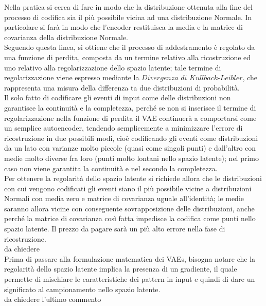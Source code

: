 Nella pratica si cerca di fare in modo che la distribuzione ottenuta alla fine del processo di codifica sia il più possibile vicina ad una distribuzione Normale. In particolare si farà in modo che l'encoder restituisca la media e la matrice di covarianza della distribuzione Normale. \\ 
Seguendo questa linea, si ottiene che il processo di addestramento è regolato da una funzione di perdita, composta da un termine relativo alla ricostruzione ed uno relativo alla regolarizzazione dello spazio latente; tale termine di regolarizzazione viene espresso mediante la $\textit{Divergenza di Kullback-Leibler}$, che rappresenta una misura della differenza ta due distribuzioni di probabilità. \\
Il solo fatto di codificare gli eventi di input come delle distribuzioni non garantisce la continuità e la completezza, perché se non si inserisce il termine di regolarizzazione nella funzione di perdita il VAE continuerà a comportarsi come un semplice autoencoder, tendendo semplicemente a minimizzare l'errore di ricostruzione in due possibili modi, cioè codificando gli eventi come distribuzioni da un lato con varianze molto piccole (quasi come singoli punti) e dall'altro con medie molto diverse fra loro (punti molto lontani nello spazio latente); nel primo caso non viene garantita la continuità e nel secondo la completezza. \\ 
Per ottenere la regolarità dello spazio latente si richiede allora che le distribuzioni con cui vengono codificati gli eventi siano il più possibile vicine a distribuzioni Normali con media zero e matrice di covarianza uguale all'identità; le medie saranno allora vicine con conseguente sovrapposizione delle distribuzioni, anche perché la matrice di covarianza così fatta impedisce la codifica come punti nello spazio latente. Il prezzo da pagare sarà un più alto errore nella fase di ricostruzione.\\ \color{red} da chiedere \color{black} \\
Prima di passare alla formulazione matematica dei VAEs, bisogna notare che la regolarità dello spazio latente implica la presenza di un gradiente, il quale permette di mischiare le caratteristiche dei pattern in input e quindi di dare un significato al campionamento nello spazio latente. \\

\color{red}
da chiedere l'ultimo commento
\color{black}

\newpage

